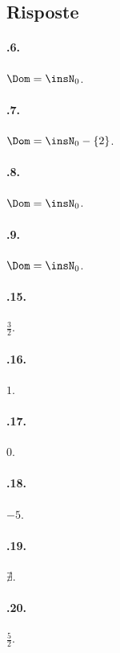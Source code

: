 \subsection{Risposte}
\begin{multicols}{2}

\paragraph{\thechapter.6.} $\Dom=\insN_0$.

\paragraph{\thechapter.7.} $\Dom=\insN_0-\{2\}$.

\paragraph{\thechapter.8.} $\Dom=\insN_0$.

\paragraph{\thechapter.9.} $\Dom=\insN_0$.

\paragraph{\thechapter.15.} $\frac{3}{2}$.

\paragraph{\thechapter.16.} $1$.

\paragraph{\thechapter.17.} $0$.

\paragraph{\thechapter.18.} $-5$.

\paragraph{\thechapter.19.} $\nexists$.

\paragraph{\thechapter.20.} $\frac{5}{2}$.


\end{multicols}
